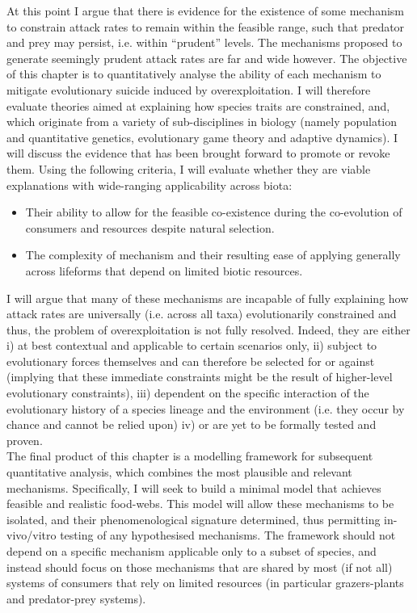\documentclass[a4paper]{report}
\begin{document}
At this point I argue that there is evidence for the existence of some mechanism to constrain attack rates to remain within the feasible range, such that predator and prey may persist, i.e. within “prudent” levels. The mechanisms proposed to generate seemingly prudent attack rates are far and wide however. The objective of this chapter is to quantitatively analyse the ability of each mechanism to mitigate evolutionary suicide induced by overexploitation. I will therefore evaluate theories aimed at explaining how species traits are constrained, and, which originate from a variety of sub-disciplines in biology (namely population and quantitative genetics, evolutionary game theory and adaptive dynamics). I will discuss the evidence that has been brought forward to promote or revoke them. Using the following criteria, I will evaluate whether they are viable explanations with wide-ranging applicability across biota:  

\begin{itemize}
\item Their ability to allow for the feasible co-existence during the co-evolution of consumers and resources despite natural selection.
\item The complexity of mechanism and their resulting ease of applying generally across lifeforms that depend on limited biotic resources. 
\end{itemize}

I will argue that many of these mechanisms are incapable of fully explaining how attack rates are universally (i.e. across all taxa) evolutionarily constrained and thus, the problem of overexploitation is not fully resolved. Indeed, they are either i) at best contextual and applicable to certain scenarios only, ii) subject to evolutionary forces themselves and can therefore be selected for or against (implying that these immediate constraints might be the result of higher-level evolutionary constraints), iii) dependent on the specific interaction of the evolutionary history of a species lineage and the environment (i.e. they occur by chance and cannot be relied upon) iv) or are yet to be formally tested and proven.\\

The final product of this chapter is a modelling framework for subsequent quantitative analysis, which combines the most plausible and relevant mechanisms. Specifically, I will seek to build a minimal model that achieves feasible and realistic food-webs. This model will allow these mechanisms to be isolated, and their phenomenological signature determined, thus permitting in-vivo/vitro testing of any hypothesised mechanisms. The framework should not depend on a specific mechanism applicable only to a subset of species, and instead should focus on those mechanisms that are shared by most (if not all) systems of consumers that rely on limited resources (in particular grazers-plants and predator-prey systems). \\
\end{document}
